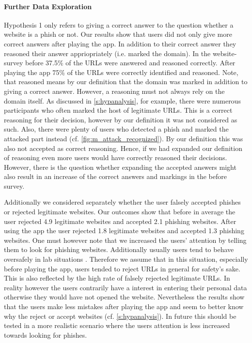 \paragraph{Further Data Exploration}
\begin{description}[leftmargin=0cm]
	\item[Correct and Reasoned Answers:] Hypothesis 1 only refers to giving a correct answer to the question whether a website is a phish or not.
	Our results show that users did not only give more correct answers after playing the app.
	In addition to their correct answer they reasoned their answer appriopriately (i.e. marked the domain).
	In the website-survey before 37.5\% of the URLs were answered and reasoned correctly.
	After playing the app 75\% of the URLs were correctly identified and reasoned. 
	Note, that reasoned means by our definition that the domain was marked in addition to giving a correct answer.
	However, a reasoning must not always rely on the domain itself. 
	As discussed in \autoref{s:hypanalysis}, for example, there were numerous participants who often marked the host of legitimate URLs.
	This is a correct reasoning for their decision, however by our definition it was not considered as such.
	Also, there were plenty of users who detected a phish and marked the attacked part instead (cf. \autoref{fig:m_attack_recognized}).
	By our definition this was also not accepted as correct reasoning.
	Hence, if we had expanded our definition of reasoning even more users would have correctly reasoned their decisions.
	However, there is the question whether expanding the accepted answers might also result in an increase of the correct answers and markings in the before survey.
	\item[False Negatives and Positives:] Additionally we considered separately whether the user falsely  accepted phishes or rejected legitimate websites. Our outcomes show that before in average the user rejected 4.9 legitimate websites and accepted 2.1 phishing websites. After using the app the user rejected 1.8 legitimate websites and accepted 1.3 phishing websites. One must however note that we increased the users' attention by telling them to look for phishing websites. Additionally usually users tend to behave oversafely in lab situations \cite{TODO:cite}. Therefore we assume that in this situation, especially before playing the app, users tended to reject URLs in general for safety's sake. This is also reflected by the high rate of falsely rejected legitimate URLs. In reality however the users contrarily have a interest in entering their personal data otherwise they would have not opened the website. Nevertheless the results show that the users make less mistakes after playing the app and seem to better know why the reject or accept websites (cf. \autoref{s:hypanalysis}). In future this should be tested in a more realistic scenario where the users attention is less increased towards looking for phishes.

\end{description}
